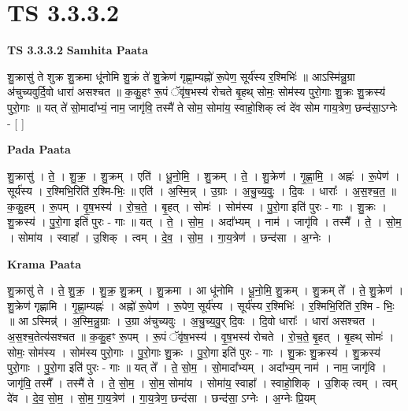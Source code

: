 \documentclass[17pt]{extarticle}
\begin{document}
\section{ TS 3.3.3.2 }

\textbf{TS 3.3.3.2 } \newline
\textbf{Samhita Paata} \newline

शु॒क्रासु॑ ते शुक्र शु॒क्रमा धू॑नोमि शु॒क्रं ते॑ शु॒क्रेण॑ गृह्णा॒म्यह्नो॑ रू॒पेण॒ सूर्य॑स्य र॒श्मिभिः॑ ॥ आऽस्मि॑न्नु॒ग्रा अ॑चुच्यवुर्दि॒वो धारा॑ असश्चत ॥ क॒कु॒हꣳ रू॒पं ॅवृ॑ष॒भस्य॑ रोचते बृ॒हथ् सोमः॒ सोम॑स्य पुरो॒गाः शु॒क्रः शु॒क्रस्य॑ पुरो॒गाः ॥ यत् ते॑ सो॒मादा᳚भ्यं॒ नाम॒ जागृ॑वि॒ तस्मै॑ ते सोम॒ सोमा॑य॒ स्वाहो॒शिक् त्वं दे॑व सोम गाय॒त्रेण॒ छन्द॑सा॒ऽग्नेः - [  ] \newline

\textbf{Pada Paata} \newline

शु॒क्रासु॑ । ते॒ । शु॒क्र॒ । शु॒क्रम् । एति॑ । धू॒नो॒मि॒ । शु॒क्रम् । ते॒ । शु॒क्रेण॑ । गृ॒ह्णा॒मि॒ । अह्नः॑ । रू॒पेण॑ । सूर्य॑स्य । र॒श्मिभि॒रिति॑ र॒श्मि-भिः॒ ॥ एति॑ । अ॒स्मि॒न्न् । उ॒ग्राः । अ॒चु॒च्य॒वुः॒ । दि॒वः । धाराः᳚ । अ॒स॒श्च॒त॒ ॥ क॒कु॒हम् । रू॒पम् । वृ॒ष॒भस्य॑ । रो॒च॒ते॒ । बृ॒हत् । सोमः॑ । सोम॑स्य । पु॒रो॒गा इति॑ पुरः - गाः । शु॒क्रः । शु॒क्रस्य॑ । पु॒रो॒गा इति॑ पुरः - गाः ॥ यत् । ते॒ । सो॒म॒ । अदा᳚भ्यम् । नाम॑ । जागृ॑वि । तस्मै᳚ । ते॒ । सो॒म॒ । सोमा॑य । स्वाहा᳚ । उ॒शिक् । त्वम् । दे॒व॒ । सो॒म॒ । गा॒य॒त्रेण॑ । छन्द॑सा । अ॒ग्नेः ।  \newline


\textbf{Krama Paata} \newline

शु॒क्रासु॑ ते । ते॒ शु॒क्र॒ । शु॒क्र॒ शु॒क्रम् । शु॒क्रमा । आ धू॑नोमि । धू॒नो॒मि॒ शु॒क्रम् । शु॒क्रम् ते᳚ । ते॒ शु॒क्रेण॑ । शु॒क्रेण॑ गृह्णामि । गृ॒ह्णा॒म्यह्नः॑ । अह्नो॑ रू॒पेण॑ । रू॒पेण॒ सूर्य॑स्य । सूर्य॑स्य र॒श्मिभिः॑ । र॒श्मिभि॒रिति॑ र॒श्मि - भिः॒ ॥ आ ऽस्मिन्न्॑ । अ॒स्मि॒न्नु॒ग्राः । उ॒ग्रा अ॑चुच्यवुः । अ॒चु॒च्य॒वु॒र् दि॒वः । दि॒वो धाराः᳚ । धारा॑ असश्चत । अ॒स॒श्च॒तेत्य॑सश्चत ॥ क॒कु॒हꣳ रू॒पम् । रू॒पं ॅवृ॑ष॒भस्य॑ । वृ॒ष॒भस्य॑ रोचते । रो॒च॒ते॒ बृ॒हत् । बृ॒हथ् सोमः॑ । सोमः॒ सोम॑स्य । सोम॑स्य पुरो॒गाः । पु॒रो॒गाः शु॒क्रः । पु॒रो॒गा इति॑ पुरः - गाः । शु॒क्रः शु॒क्रस्य॑ । शु॒क्रस्य॑ पुरो॒गाः । पु॒रो॒गा इति॑ पुरः - गाः ॥ यत् ते᳚ । ते॒ सो॒म॒ । सो॒मादा᳚भ्यम् । अदा᳚भ्य॒म् नाम॑ । नाम॒ जागृ॑वि । जागृ॑वि॒ तस्मै᳚ । तस्मै॑ ते । ते॒ सो॒म॒ । सो॒म॒ सोमा॑य । सोमा॑य॒ स्वाहा᳚ । स्वाहो॒शिक् । उ॒शिक् त्वम् । त्वम् दे॑व । दे॒व॒ सो॒म॒ । सो॒म॒ गा॒य॒त्रेण॑ । गा॒य॒त्रेण॒ छन्द॑सा । छन्द॑सा॒ ऽग्नेः । अ॒ग्नेः प्रि॒यम् \newline
\end{document}
